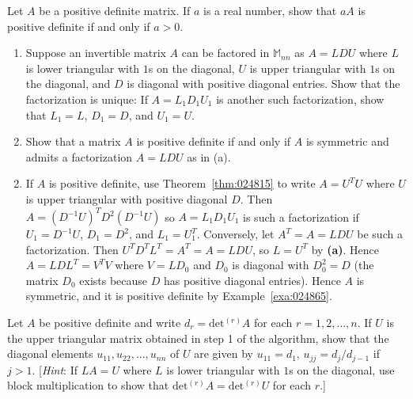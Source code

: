 \documentclass{ximera}
\begin{document}
\begin{problem}\label{prob:pos_def_11}
Let $A$ be a positive definite matrix. If $a$ is a real number, show that $aA$ is positive definite if and only if $a > 0$.
\end{problem}

\begin{problem}\label{prob:pos_def_12}
\begin{enumerate}
\item Suppose an invertible matrix $A$ can be factored in $\mathbb{M}_{nn}$ as $A = LDU$ where $L$ is lower triangular with $1$s on the diagonal, $U$ is upper triangular with $1$s on the diagonal, and $D$ is diagonal with positive diagonal entries. Show that the factorization is unique: If $A = L_{1}D_{1}U_{1}$ is another such factorization, show that $L_{1} = L$, $D_{1} = D$, and $U_{1} = U$.

\item Show that a matrix $A$ is positive definite if and only if $A$ is symmetric and admits a factorization $A = LDU$ as in (a).
\end{enumerate}
\begin{hint}
\begin{enumerate}[label={\alph*.}]
\setcounter{enumi}{1}
\item  If $A$ is positive definite, use Theorem~\ref{thm:024815} to write $A = U^{T}U$ where $U$ is upper triangular with positive diagonal $D$. Then $A = (D^{-1}U)^{T}D^{2}(D^{-1}U)$ so $A = L_{1}D_{1}U_{1}$ is such a factorization if $U_{1} = D^{-1}U$, $D_{1} = D^{2}$, and $L_{1} = U^T_1$. Conversely, let $A^{T} = A = LDU$ be such a factorization. Then $U^{T}D^{T}L^{T} = A^{T} = A = LDU$, so $L = U^{T}$ by \textbf{(a)}. Hence $A = LDL^{T} = V^{T}V$ where $V = LD_{0}$ and $D_{0}$ is diagonal with $D^2_0 = D$ (the matrix $D_{0}$ exists because $D$ has positive diagonal entries). Hence $A$ is symmetric, and it is positive definite by Example~\ref{exa:024865}.

\end{enumerate}
\end{hint}
\end{problem}


\begin{problem}\label{prob:pos_def_13}
Let $A$ be positive definite and write $d_{r} = \mbox{det}{^{(r)}A}$ for each $r = 1, 2, \dots, n$. If $U$ is the upper triangular matrix obtained in step 1 of the algorithm, show that the diagonal elements $u_{11}, u_{22}, \dots, u_{nn}$ of $U$ are given by $u_{11} = d_{1}$, $u_{jj} = d_{j} / d_{j-1}$ if $j > 1$. [\textit{Hint}: If $LA = U$ where $L$ is lower triangular with $1$s on the diagonal, use block multiplication to show that $\mbox{det}{^{(r)}A} = \mbox{det}{^{(r)}U}$ for each $r$.]
\end{problem}
\end{document}
